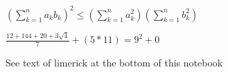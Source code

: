 \documentclass[letterpaper,10pt,english]{jupyterBook}
\begin{document}
\sphinxAtStartPar
\(\left( \sum_{k=1}^n a_k b_k \right)^2 \leq \left( \sum_{k=1}^n a_k^2 \right) \left( \sum_{k=1}^n b_k^2 \right)\)

\begin{DUlineblock}{0em}
\item[] 
\end{DUlineblock}

\sphinxAtStartPar
\(\frac{12 + 144  + 20 + 3\sqrt{4}}{7} + (5 * 11) = 9^2 + 0\) 

\sphinxAtStartPar
See text of limerick at the bottom of this notebook

\begin{DUlineblock}{0em}
\item[] 
\end{DUlineblock}
\end{document}
